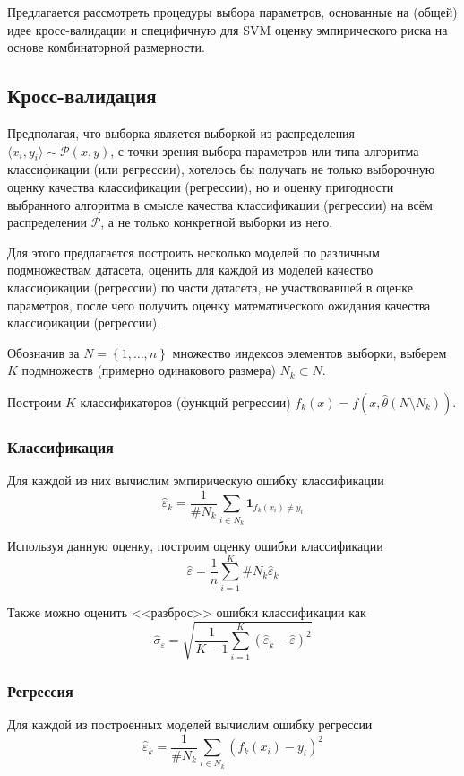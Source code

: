 \documentclass[11pt, a4paper]{article}\usepackage[]{graphicx}\usepackage[]{color}
\begin{document}
Предлагается рассмотреть процедуры выбора параметров, основанные на (общей) идее кросс-валидации и специфичную
для SVM оценку эмпирического риска на основе комбинаторной размерности.

\subsection{Кросс-валидация}
Предполагая, что выборка является выборкой из распределения $\langle x_i, y_i\rangle\sim\mathcal{P}\left(x,y\right)$,
с точки зрения выбора параметров или типа алгоритма классификации (или регрессии), хотелось бы получать не только
выборочную оценку качества классификации (регрессии), но и оценку пригодности выбранного алгоритма в смысле
качества классификации (регрессии) на всём распределении $\mathcal{P}$, а не только конкретной выборки из него.

Для этого предлагается построить несколько моделей по различным подмножествам датасета, оценить для каждой из моделей
качество классификации (регрессии) по части датасета, не участвовавшей в оценке параметров, после чего получить оценку
математического ожидания качества классификации (регрессии).

Обозначив за $N=\left\{1,\dots,n\right\}$ множество индексов элементов выборки, выберем $K$ подмножеств (примерно одинакового размера)
$N_k\subset N$.

Построим $K$ классификаторов (функций регрессии) $f_k\left(x\right)=f\left(x, \hat{\theta}\left(N\setminus N_k\right)\right)$.

\subsubsection{Классификация}
Для каждой из них вычислим эмпирическую ошибку классификации
\[
    \hat{\varepsilon}_k = \frac{1}{\#N_k}\sum\limits_{i\in N_k}\mathbf{1}_{f_k\left(x_i\right)\neq y_i}
\]

Используя данную оценку, построим оценку ошибки классификации
\[
    \hat{\varepsilon} = \frac{1}{n}\sum\limits_{i=1}^{K}\#N_k\hat{\varepsilon}_k
\]

Также можно оценить <<разброс>> ошибки классификации как
\[
    \hat{\sigma}_\varepsilon = \sqrt{\frac{1}{K-1}\sum\limits_{i=1}^K\left(\hat{\varepsilon}_k-\hat{\varepsilon}\right)^2}
\]

\subsubsection{Регрессия}
Для каждой из построенных моделей вычислим ошибку регрессии
\[
    \hat{\varepsilon}_k = \frac{1}{\#N_k}\sum\limits_{i\in N_k}\left(f_k\left(x_i\right) - y_i\right)^2
\]
\end{document}
